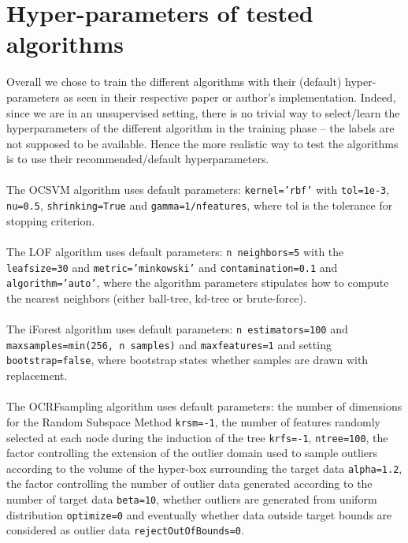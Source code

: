 \section{Hyper-parameters of tested algorithms}
\label{supp:hyper_choice}
Overall we chose to train the different algorithms with their (default)
hyper-parameters as seen in their respective paper or author's implementation.
Indeed, since we are in an unsupervised setting, there is no trivial way to
select/learn the hyperparameters of the different algorithm in the training
phase -- the labels are not supposed to be available. Hence the more realistic
way to test the algorithms is to use their recommended/default hyperparameters.
\paragraph{}
The \ac{OCSVM} algorithm uses default parameters: \texttt{kernel='rbf'} with
\texttt{tol=1e-3}, \texttt{nu=0.5}, \texttt{shrinking=True} and
\texttt{gamma=1/n\textunderscore features}, where tol is the tolerance for
stopping
criterion.
\paragraph{}
The \ac{LOF} algorithm uses default parameters: \texttt{n\textunderscore
neighbors=5} with the \texttt{leaf\textunderscore size=30} and
\texttt{metric='minkowski'} and \texttt{contamination=0.1} and
\texttt{algorithm='auto'}, where the algorithm parameters stipulates how to
compute the nearest neighbors (either ball-tree, kd-tree or brute-force).
\paragraph{}
The \ac{iForest} algorithm uses default parameters: \texttt{n\textunderscore
estimators=100} and \texttt{max\textunderscore samples=min(256, n\textunderscore
samples)} and \texttt{max\textunderscore features=1} and setting
\texttt{bootstrap=false}, where bootstrap states whether samples are drawn with
replacement.
\paragraph{}
The \acs{OCRFsampling} algorithm uses default parameters: the number of
dimensions for the Random Subspace Method \texttt{krsm=-1}, the number of
features randomly selected at each node during the induction of the tree
\texttt{krfs=-1}, \texttt{n\textunderscore tree=100}, the factor controlling
the extension of the outlier domain used to sample outliers according to the
volume of the hyper-box surrounding the target data \texttt{alpha=1.2}, the
factor controlling the number of outlier data generated according to the number
of target data \texttt{beta=10}, whether outliers are generated from uniform
distribution \texttt{optimize=0} and eventually whether data outside target
bounds are considered as outlier data \texttt{rejectOutOfBounds=0}.
